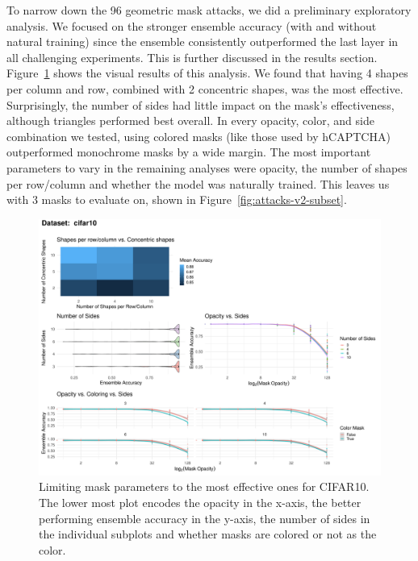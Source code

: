 \documentclass[a4paper, oneside]{discothesis}
\begin{document}
To narrow down the 96 geometric mask attacks, we did a preliminary exploratory analysis. We focused on the stronger ensemble accuracy (with and without natural training) since the ensemble consistently outperformed the last layer in all challenging experiments. This is further discussed in the results section. Figure~\ref{fig:mask-limit} shows the visual results of this analysis. We found that having 4 shapes per column and row, combined with 2 concentric shapes, was the most effective. Surprisingly, the number of sides had little impact on the mask's effectiveness, although triangles performed best overall. In every opacity, color, and side combination we tested, using colored masks (like those used by hCAPTCHA) outperformed monochrome masks by a wide margin. The most important parameters to vary in the remaining analyses were opacity, the number of shapes per row/column and whether the model was naturally trained. This leaves us with 3 masks to evaluate on, shown in Figure~\ref{fig:attacks-v2-subset}.

\begin{figure}
	\centering
	\includegraphics[width=1\columnwidth,keepaspectratio]{figures/self_ensemble_mask_exploration_cifar10.pdf}
	\caption{Limiting mask parameters to the most effective ones for CIFAR10. The lower most plot encodes the opacity in the x-axis, the better performing ensemble accuracy in the y-axis, the number of sides in the individual subplots and whether masks are colored or not as the color.}
	\label{fig:mask-limit}
\end{figure}
\end{document}
